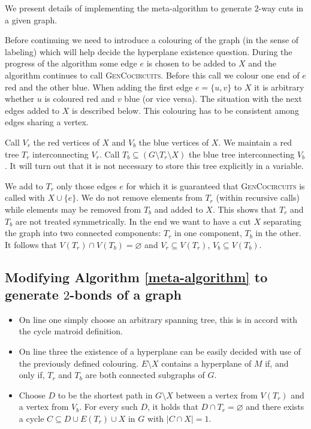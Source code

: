 We present details of implementing the meta-algorithm to generate $2$-way cuts in a given graph.

Before continuing we need to introduce a colouring of the graph (in the sense of labeling) which will help decide the hyperplane existence question. During the progress of the algorithm some edge $e$ is chosen to be added to $X$ and the algorithm continues to call \textsc{GenCocircuits}. Before this call we colour one end of $e$ red and the other blue. When adding the first edge $e = \{u ,v\}$ to $X$ it is arbitrary whether $u$ is coloured red and $v$ blue (or vice versa). The situation with the next edges added to $X$ is described below. This colouring has to be consistent among edges sharing a vertex.

Call $V_r$ the red vertices of $X$ and $V_b$ the blue vertices of $X$. We maintain a red tree $T_r$ interconnecting $V_r$. Call $T_b \subseteq (G \setminus T_r \setminus X)$ the blue tree interconnecting $V_b$. It will turn out that it is not necessary to store this tree explicitly in a variable.

We add to $T_r$ only those edges $e$ for which it is guaranteed that \textsc{GenCocircuits} is called with $X \cup \{e\}$. We do not remove elements from $T_r$ (within recursive calls) while elements may be removed from $T_b$ and added to $X$. This shows that $T_r$ and $T_b$ are not treated symmetrically. In the end we want to have a cut $X$ separating the graph into two connected components: $T_r$ in one component, $T_b$ in the other. It follows that $V(T_r) \cap V(T_b) = \varnothing$ and $V_r \subseteq V(T_r)$, $V_b \subseteq V(T_b)$.

\subsection*{Modifying Algorithm \ref{meta-algorithm} to generate $2$-bonds of a graph}

\begin{itemize}
	\item On line one simply choose an arbitrary spanning tree, this is in accord with the cycle matroid definition.

	\item On line three the existence of a hyperplane can be easily decided with use of the previously defined colouring. $E \setminus X$ contains a hyperplane of $M$ if, and only if, $T_r$ and $T_b$ are both connected subgraphs of $G$.

	\item Choose $D$ to be the shortest path in $G \setminus X$ between a vertex from $V(T_r)$ and a vertex from $V_b$. For every such $D$, it holds that $D \cap T_r = \varnothing$ and there exists a cycle $C \subseteq D \cup E(T_r) \cup X$ in $G$ with $\lvert C \cap X \rvert = 1$.

\end{itemize}

